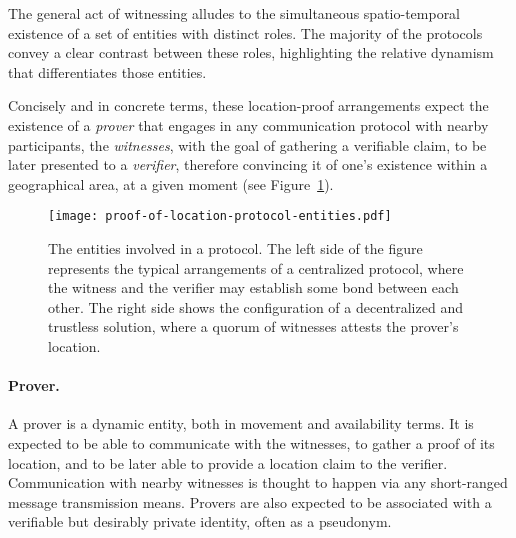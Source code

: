 The general act of witnessing alludes to the simultaneous spatio-temporal existence of a set of entities with distinct roles. The majority of the protocols convey a clear contrast between these roles, highlighting the relative dynamism that differentiates those entities. 


Concisely and in concrete terms, these location-proof arrangements expect the existence of a \emph{prover} that engages in any communication protocol with nearby participants, the \emph{witnesses}, with the goal of gathering a verifiable \pol{} claim, to be later presented to a \emph{verifier}, therefore convincing it of one's existence within a geographical area, at a given moment \cite{dupin2018location} (see Figure~\ref{fig:proof-of-location-protocol-entities}).

\begin{figure}[h!]
    \begin{center}
    \texttt{[image: proof-of-location-protocol-entities.pdf]}
    \caption{The entities involved in a \pol{} protocol. The left side of the figure represents the typical arrangements of a centralized protocol, where the witness and the verifier may establish some bond between each other. The right side shows the configuration of a decentralized and trustless solution, where a quorum of witnesses attests the prover's location.}
    \label{fig:proof-of-location-protocol-entities}
    \end{center}
\end{figure}

\paragraph{Prover.} A prover is a dynamic entity, both in movement and availability terms. It is expected to be able to communicate with the witnesses, to gather a proof of its location, and to be later able to provide a location claim to the verifier. Communication with nearby witnesses is thought to happen via any short-ranged message transmission means. Provers are also expected to be associated with a verifiable but desirably private identity, often as a pseudonym.

